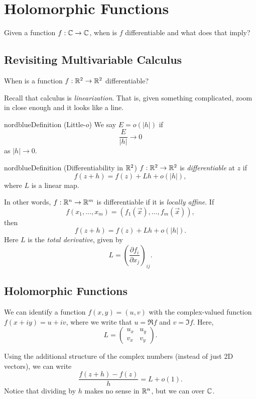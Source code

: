 \chapter{Holomorphic Functions}

Given a function $f : \mathbb{C} \to \mathbb{C}$, when is $f$
differentiable and what does that imply?

\section{Revisiting Multivariable Calculus}
When is a function $f : \mathbb{R}^2 \to \mathbb{R}^2$ differentiable?

Recall that calculus is \textit{linearization}. That is,
given something complicated, zoom in close enough and
it looks like a line.

\begin{mybox}{nordblue}{Definition (Little-$o$)}
  We say $E = o(|h|)$ if
  \[\frac{E}{|h|} \to 0\]
  as $|h| \to 0$.
\end{mybox}

\begin{mybox}{nordblue}{Definition (Differentiability in $\mathbb{R}^2$)}
  $f : \mathbb{R}^2 \to \mathbb{R}^2$ is \textit{differentiable} at
  $z$ if
  \[f(z + h) = f(z) + Lh + o(|h|),\]
  where $L$ is a linear map.
\end{mybox}

In other words, $f : \mathbb{R}^n \to \mathbb{R}^m$ is differentiable if
it is \textit{locally affine}. If
\[
f(x_1, \dots, x_m) = (f_1(\vec{x}), \dots, f_m(\vec{x}))
,\]
then
\[
f(z + h) = f(z) + Lh + o(|h|)
.\] 
Here $L$ is the \textit{total derivative}, given by
\[
  L = \left(\frac{\partial f_i}{\partial x_j}\right)_{ij}
.\]

\section{Holomorphic Functions}
We can identify a function $f(x, y) = (u, v)$ with
the complex-valued function $f(x + iy) = u + iv$, where
we write that $u = \Re f$ and $v = \Im f$. Here,
\[
L =
\left(\begin{matrix}
  u_x & u_y \\
  v_x & v_y
\end{matrix}\right)
.\] 

Using the additional structure of the complex numbers
(instead of just 2D vectors), we can write
\[\frac{f(z + h) - f(z)}{h} = L + o(1).\]
Notice that dividing by $h$ makes no sense in $\mathbb{R}^n$, but
we can over $\mathbb{C}$.


